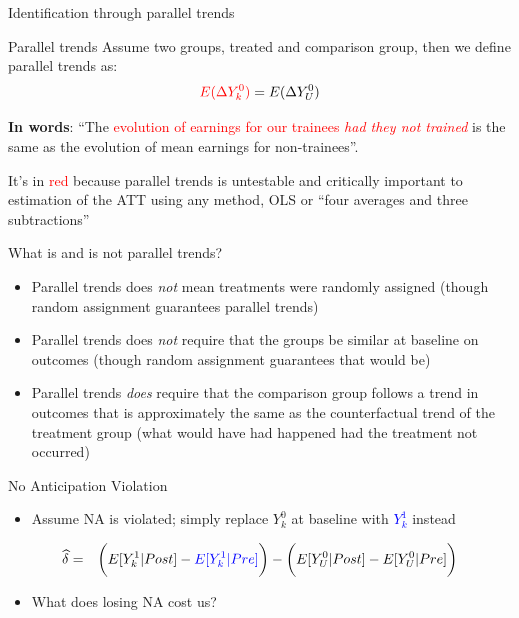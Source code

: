 \documentclass{beamer}
\begin{document}
\begin{frame}{Identification through parallel trends}
	

	\begin{block}{Parallel trends}
	Assume two groups, treated and comparison group, then we define parallel trends as:	 $$\textcolor{red}{E(}\textcolor{red}{\Delta Y^0_k)} = E(\Delta Y^0_U)$$
	\end{block}

\textbf{In words}: ``The \textcolor{red}{evolution of earnings for our trainees \emph{had they not trained}} is the same as the evolution of mean earnings for non-trainees''.  

\bigskip

It's in \textcolor{red}{red} because parallel trends is untestable and critically important to estimation of the ATT using any method, OLS or ``four averages and three subtractions''

	

	
\end{frame}


\begin{frame}{What is and is not parallel trends?}

\begin{itemize}
\item Parallel trends does \emph{not} mean treatments were randomly assigned (though random assignment guarantees parallel trends)
\item Parallel trends does \emph{not} require that the groups be similar at baseline on outcomes (though random assignment guarantees that would be)
\item Parallel trends \emph{does} require that the comparison group follows a trend in outcomes that is approximately the same as the counterfactual trend of the treatment group (what would have had happened had the treatment not occurred)
\end{itemize}

\end{frame}

\begin{frame}{No Anticipation Violation}

\begin{itemize}
\item Assume NA is violated; simply replace $Y^0_k$ at baseline with \textcolor{blue}{$Y^1_k$} instead
\end{itemize}


\begin{eqnarray*}
\widehat{\delta} &=& \bigg ( E[Y^1_k|Post] - \textcolor{blue}{E[Y^1_k|Pre]} \bigg ) - \bigg ( E[Y^0_U | Post ] - E[ Y^0_U | Pre] \bigg) \\
\end{eqnarray*}

\begin{itemize}
\item What does losing NA cost us?
\end{itemize}


\end{frame}
\end{document}
